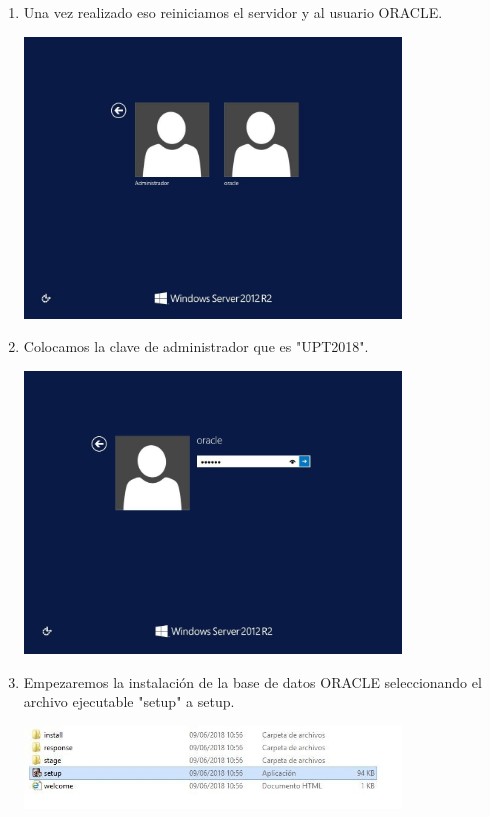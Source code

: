 \begin{enumerate}[1.]
\begin{center}
	\end{center}
	\hfill \break
	\hfill \break
	\hfill \break
	\hfill \break
	\item Una vez realizado eso reiniciamos el servidor y al usuario ORACLE.\\
	\begin{center}
	\includegraphics[width=10cm]{./Imagenes/jhordy3} 
	\end{center}
	\hfill \break
	\hfill \break
	\hfill \break
	\hfill \break
	\item Colocamos la clave de administrador que es  "UPT2018".\\
	\begin{center}
	\includegraphics[width=10cm]{./Imagenes/jhordy4} 
	\end{center}
	\hfill \break
	\hfill \break
	\hfill \break
	\hfill \break
	\item Empezaremos la instalaci\'on de la base de datos ORACLE seleccionando el archivo ejecutable "setup" a setup.\\
	\begin{center}
	\includegraphics[width=10cm]{./Imagenes/jhordy5} 

\end{center}
\end{enumerate}
